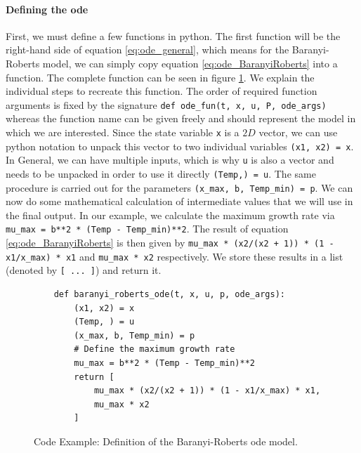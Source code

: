\documentclass[10pt,A4paper]{article}
\begin{document}
\paragraph{Defining the \acs{ode}} First, we must define a few functions in python.
The first function will be the right-hand side of equation \ref{eq:ode_general}, which means for the Baranyi-Roberts model, we can simply copy equation \ref{eq:ode_BaranyiRoberts} into a function.
The complete function can be seen in figure \ref{fig:code_baranyi_roberts_ode_fun}.
We explain the individual steps to recreate this function.
The order of required function arguments is fixed by the signature
\texttt{def ode_fun(t, x, u, P, ode_args)} whereas the function name can be given freely and should represent the model in which we are interested.
Since the state variable \texttt{x} is a $2D$ vector, we can use python notation to unpack this vector to two individual variables
\texttt{(x1, x2) = x}.
In General, we can have multiple inputs, which is why \texttt{u} is also a vector and needs to be unpacked in order to use it directly \texttt{(Temp,) = u}.
The same procedure is carried out for the parameters \texttt{(x_max, b, Temp_min) = p}.
We can now do some mathematical calculation of intermediate values that we will use in the final output.
In our example, we calculate the maximum growth rate via \texttt{mu_max = b**2 * (Temp - Temp_min)**2}.
The result of equation \ref{eq:ode_BaranyiRoberts} is then given by \texttt{mu_max * (x2/(x2 + 1)) * (1 - x1/x_max) * x1} and 
\texttt{mu_max * x2} respectively.
We store these results in a list (denoted by \texttt{[ ... ]}) and return it.
\begin{figure}
    \begin{verbatim}
    def baranyi_roberts_ode(t, x, u, p, ode_args):
        (x1, x2) = x
        (Temp, ) = u
        (x_max, b, Temp_min) = p
        # Define the maximum growth rate
        mu_max = b**2 * (Temp - Temp_min)**2
        return [
            mu_max * (x2/(x2 + 1)) * (1 - x1/x_max) * x1,
            mu_max * x2
        ]
    \end{verbatim}
    \caption{Code Example: Definition of the Baranyi-Roberts \ac{ode} model.}
    \label{fig:code_baranyi_roberts_ode_fun}
\end{figure}
%
\end{document}
